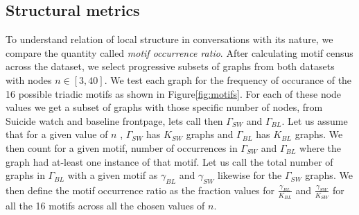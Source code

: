 \subsection{Structural metrics}
\label{Sec:motif}
To understand relation of local structure in conversations with its nature, we compare the quantity called \textsl{motif occurrence ratio}. After calculating motif census across the dataset\cite{Batagelj2001}, we select progressive subsets of graphs from both datasets with nodes $n \in [3 , 40]$.  We test each graph for the frequency of occurance of the 16 possible triadic motifs as shown in Figure\ref{fig:motifs}. For each of these node values we get a subset of graphs with those specific number of nodes, from Suicide watch and baseline frontpage, lets call then $\Gamma_{SW}$ and $\Gamma_{BL}$. Let us assume that for a given value of $n$ , $\Gamma_{SW}$ has $K_{SW}$ graphs and $\Gamma_{BL}$ has $K_{BL}$ graphs. We then count for a given motif, number of occurrences in $\Gamma_{SW}$ and $\Gamma_{BL}$ where the graph had at-least one instance of that motif. Let us call the total number of graphs in $\Gamma_{BL}$ with a given motif as $\gamma_{BL}$ and $\gamma_{SW}$ likewise for the $\Gamma_{SW}$ graphs. 
We then define the motif occurrence ratio as the fraction values for $\frac{\gamma_{BL}}{K_{BL}}$ and $\frac{\gamma_{SW}}{K_{SW}}$ for all the 16 motifs across all the chosen values of $n$. 


